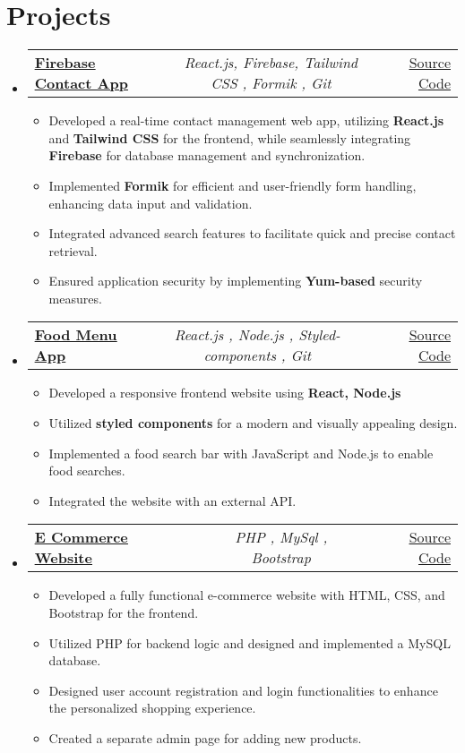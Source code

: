\documentclass[a4paper,11pt]{article}
\makeatletter
\newcommand{\resumeItem}[1]{
  \item\small{#1}
}
\newcommand{\resumeItemListStart}{\begin{itemize}[rightmargin=0.11in]}
\newcommand{\resumeItemListEnd}{\end{itemize}}
\newcommand{\resumeTrioHeading}[3]{
  \item\small{
    \begin{tabular*}{0.96\textwidth}[t]{
      l@{\extracolsep{\fill}}c@{\extracolsep{\fill}}r
    }
      \textbf{#1} & \textit{#2} & #3
    \end{tabular*}
  }
}
\newcommand{\resumeHeadingListStart}{
  \begin{itemize}[leftmargin=0.15in, label={}]
}
\newcommand{\resumeHeadingListEnd}{\end{itemize}}
\makeatother
\begin{document}
\section{Projects}
  \resumeHeadingListStart{}
    \resumeTrioHeading{\href{https://github.com/akshayvenu/firebase-contact-app}{\uline{Firebase Contact App}}}{React.js, Firebase, Tailwind CSS , Formik , Git}{\href{https://github.com/akshayvenu/firebase-contact-app}{\uline{Source Code}}}
      \resumeItemListStart{}
        \resumeItem{Developed a real-time contact management web app, utilizing \textbf{React.js} and \textbf{Tailwind CSS} for the frontend, while seamlessly integrating \textbf{Firebase} for database management and synchronization.}
        \resumeItem{Implemented \textbf{Formik} for efficient and user-friendly form handling, enhancing data input and validation.}
        \resumeItem{Integrated advanced search features to facilitate quick and precise contact retrieval.}
        \resumeItem{Ensured application security by implementing \textbf{Yum-based} security measures.}
      \resumeItemListEnd{}
    \resumeTrioHeading{\href{https://github.com/akshayvenu/Food-Menu-App}{\uline{Food Menu App}}}{React.js , Node.js , Styled-components ,  Git}{\href{https://github.com/akshayvenu/Food-Menu-App}{\uline{Source Code}}}
      \resumeItemListStart{}
        \resumeItem{Developed a responsive frontend website using \textbf{React, Node.js}}
        \resumeItem{Utilized   \textbf{styled components} for a modern and visually appealing design.}
        \resumeItem{Implemented a food search bar with JavaScript and Node.js to enable food searches. }
        \resumeItem{Integrated the website with an external API.}
      \resumeItemListEnd{}

      \resumeTrioHeading{\href{https://drive.google.com/drive/folders/17HSZkWrPgKbkiQXYwWKVpN-JWWtzN0HU?usp=sharing}{\uline{E Commerce Website}}}{PHP , MySql , Bootstrap }{\href{https://drive.google.com/drive/folders/17HSZkWrPgKbkiQXYwWKVpN-JWWtzN0HU?usp=sharing}{\uline{Source Code}}}
      \resumeItemListStart{}
        \resumeItem{Developed a fully functional e-commerce website with HTML, CSS, and Bootstrap for the frontend.}
        \resumeItem{Utilized PHP for backend logic and designed and implemented a MySQL database.}
        \resumeItem{Designed user account registration and login functionalities to enhance the personalized shopping experience.}
        \resumeItem{Created a separate admin page for adding new products.}
      \resumeItemListEnd{}
  \resumeHeadingListEnd{}
\end{document}
